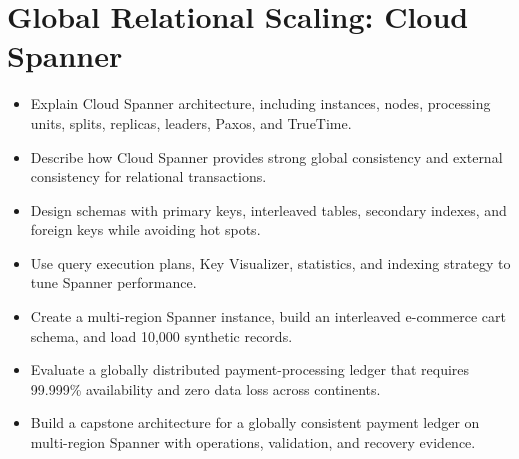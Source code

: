 \chapter{Global Relational Scaling: Cloud Spanner}

\begin{objectives}
\begin{itemize}
    \item Explain Cloud Spanner architecture, including instances, nodes, processing units, splits, replicas, leaders, Paxos, and TrueTime.
    \item Describe how Cloud Spanner provides strong global consistency and external consistency for relational transactions.
    \item Design schemas with primary keys, interleaved tables, secondary indexes, and foreign keys while avoiding hot spots.
    \item Use query execution plans, Key Visualizer, statistics, and indexing strategy to tune Spanner performance.
    \item Create a multi-region Spanner instance, build an interleaved e-commerce cart schema, and load 10,000 synthetic records.
    \item Evaluate a globally distributed payment-processing ledger that requires 99.999\% availability and zero data loss across continents.
    \item Build a capstone architecture for a globally consistent payment ledger on multi-region Spanner with operations, validation, and recovery evidence.
\end{itemize}
\end{objectives}

